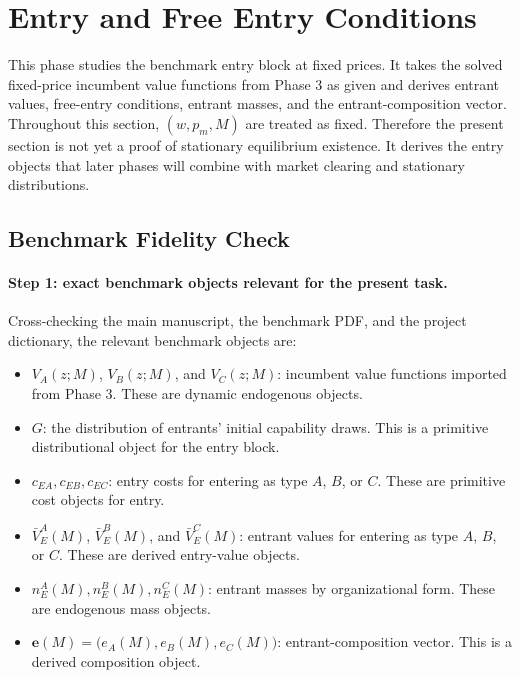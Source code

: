 \section{Entry and Free Entry Conditions}

This phase studies the benchmark entry block at fixed prices. It takes the solved fixed-price incumbent value functions from Phase 3 as given and derives entrant values, free-entry conditions, entrant masses, and the entrant-composition vector. Throughout this section, $(w,p_m,M)$ are treated as fixed. Therefore the present section is not yet a proof of stationary equilibrium existence. It derives the entry objects that later phases will combine with market clearing and stationary distributions.

\subsection{Benchmark Fidelity Check}

\paragraph{Step 1: exact benchmark objects relevant for the present task.}
Cross-checking the main manuscript, the benchmark PDF, and the project dictionary, the relevant benchmark objects are:
\begin{itemize}
    \item $V_A(z;M)$, $V_B(z;M)$, and $V_C(z;M)$: incumbent value functions imported from Phase 3. These are dynamic endogenous objects.
    \item $G$: the distribution of entrants' initial capability draws. This is a primitive distributional object for the entry block.
    \item $c_{EA},c_{EB},c_{EC}$: entry costs for entering as type $A$, $B$, or $C$. These are primitive cost objects for entry.
    \item $\bar V_E^A(M)$, $\bar V_E^B(M)$, and $\bar V_E^C(M)$: entrant values for entering as type $A$, $B$, or $C$. These are derived entry-value objects.
    \item $n_E^A(M),n_E^B(M),n_E^C(M)$: entrant masses by organizational form. These are endogenous mass objects.
    \item $\mathbf e(M)=\bigl(e_A(M),e_B(M),e_C(M)\bigr)$: entrant-composition vector. This is a derived composition object.
\end{itemize}

